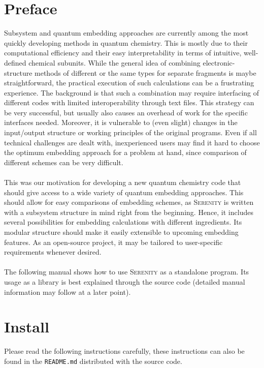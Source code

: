 \documentclass[bibliography=totocnumbered,a4paper,10pt]{scrartcl}
\newcommand{
\serenity}{\textsc{Serenity}\xspace}
\begin{document}
\section{Preface}
Subsystem and quantum embedding approaches are currently among the most quickly developing
methods in quantum chemistry. This is mostly due to their computational efficiency
and their easy interpretability in terms of intuitive, well-defined chemical subunits.
While the general idea of combining electronic-structure methods of different or the same
types for separate fragments is maybe straightforward, the practical execution of such
calculations can be a frustrating experience. The background is that such a combination
may require interfacing of different codes with limited interoperability through text files.
This strategy can be very successful, but usually also causes an overhead of work for the specific
interfaces needed. Moreover, it is vulnerable to (even slight) changes in the input/output
structure or working principles of the original programs. Even if all technical challenges
are dealt with, inexperienced users may find it hard to choose the optimum embedding approach
for a problem at hand, since comparison of different schemes can be very difficult.\\
\\
This was our motivation for developing a new quantum chemistry code that should give access
to a wide variety of quantum embedding approaches. This should allow for easy comparisons
of embedding schemes, as \serenity is written with a subsystem structure in mind right from
the beginning. Hence, it includes several possibilities for embedding calculations with
different ingredients. Its modular structure should make it easily extensible to upcoming
embedding features. As an open-source project, it may be tailored to user-specific requirements
whenever desired.\\
\\
The following manual shows how to use \serenity as a standalone program. Its usage as a
library is best explained through the source code (detailed manual 
information may follow at a later point).



\newpage
\section{Install}
Please read the following instructions carefully, these instructions can also be found in the \texttt{README.md} distributed with
the source code.
\end{document}
